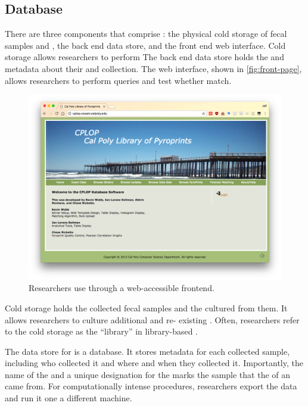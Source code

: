 \subsection{Database}
There are three components that comprise \cplop{}: the physical cold storage of fecal samples and \isols{}, the back end data store, and the front end web interface.
Cold storage allows \cplop{} researchers to perform 
The back end data store holds the \pyros{} and metadata about their \spec{} and collection.
The web interface, shown in \autoref{fig:front-page}, allows researchers to perform queries and test whether \isols{} match.
\begin{figure}
    \centering
    \includegraphics[width=\frontendwidth]{figures/frontend/front-page}
    \caption{Researchers use \cplop{} through a web-accessible frontend.}
    \label{fig:front-page}
\end{figure}
Cold storage holds the collected fecal samples and the \isols{} cultured from them.
It allows \cplop{} researchers to culture additional \isols{} and re-\pyro{} existing \isols{}.
Often, researchers refer to the cold storage as the ``library'' in library-based \mst{}.

The data store for \cplop{} \pyros{} is a \mysql{} database.
It stores metadata for each collected sample, including who collected it and where and when they collected it.
Importantly, the name of the \spec{} and a unique designation for the \host{} marks the sample that the \pyros{} of an \isol{} came from.
For computationally intense procedures, researchers export the data and run it one a different machine.

